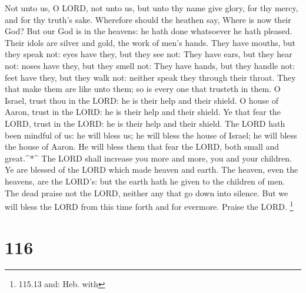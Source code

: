  Not unto us, O LORD, not unto us, but unto thy name give
glory, for thy mercy, and for thy truth's sake.  Wherefore
should the heathen say, Where is now their God?  But our God
is in the heavens: he hath done whatsoever he hath pleased. 
Their idols are silver and gold, the work of men's hands. 
They have mouths, but they speak not: eyes have they, but they see not:
 They have ears, but they hear not: noses have they, but
they smell not:  They have hands, but they handle not: feet
have they, but they walk not: neither speak they through their throat.
 They that make them are like unto them; so is every one
that trusteth in them.  O Israel, trust thou in the LORD: he
is their help and their shield.  O house of Aaron, trust in
the LORD: he is their help and their shield.  Ye that fear
the LORD, trust in the LORD: he is their help and their shield.
 The LORD hath been mindful of us: he will bless us; he
will bless the house of Israel; he will bless the house of Aaron.
 He will bless them that fear the LORD, both small and
great.\^{}*\^{}  The LORD shall increase you more and more,
you and your children.  Ye are blessed of the LORD which
made heaven and earth.  The heaven, even the heavens, are
the LORD's: but the earth hath he given to the children of men.
 The dead praise not the LORD, neither any that go down
into silence.  But we will bless the LORD from this time
forth and for evermore. Praise the LORD. \footnote{115.13 and: Heb. with}

\hypertarget{section-115}{%
\section{116}\label{section-115}}

